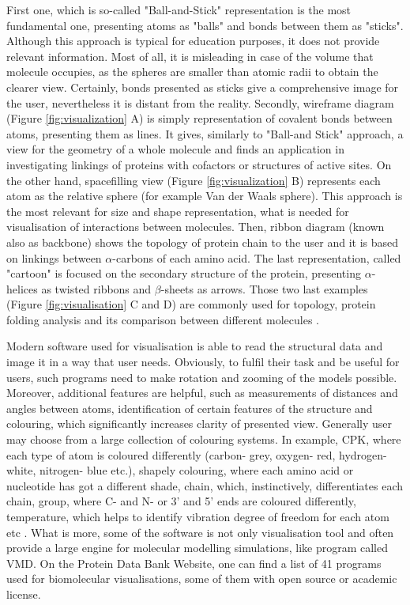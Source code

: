 First one, which is so-called "Ball-and-Stick" representation is the most fundamental one, presenting atoms as "balls" and bonds between them as "sticks". Although this approach is typical for education purposes, it does not provide relevant information. Most of all, it is misleading in case of the volume that molecule occupies, as the spheres are smaller than atomic radii to obtain the clearer view. Certainly, bonds presented as sticks give a comprehensive image for the user, nevertheless it is distant from the reality.  
Secondly, wireframe diagram (Figure \ref{fig:visualization} A) is simply representation of covalent bonds between atoms, presenting them as lines. It gives, similarly to "Ball-and Stick" approach, a view for the geometry of a whole molecule and finds an application in investigating linkings of proteins with cofactors or structures of active sites. On the other hand, spacefilling view (Figure \ref{fig:visualization} B) represents each atom as the relative sphere (for example Van der Waals sphere). This approach is the most relevant for size and shape representation, what is needed for visualisation of interactions between molecules. Then, ribbon diagram (known also as backbone) shows the topology of protein chain to the user and it is based on linkings between $\alpha$-carbons of each amino acid. The last representation, called "cartoon" is focused on the secondary structure of the protein, presenting $\alpha$-helices as twisted ribbons and $\beta$-sheets as arrows. Those two last examples (Figure \ref{fig:visualisation} C and D) are commonly used for topology, protein folding analysis and its comparison between different molecules \citep{Goodsell04, Gruca10}. 

Modern software used for visualisation is able to read the structural data and image it in a way that user needs. Obviously, to fulfil their task and be useful for users, such programs need to make rotation and zooming of the models possible. Moreover, additional features are helpful, such as measurements of distances and angles between atoms, identification of certain features of the structure and colouring, which significantly increases clarity of presented view. Generally user may choose from a large collection of colouring systems. In example, CPK, where each type of atom is coloured differently (carbon- grey, oxygen- red, hydrogen- white, nitrogen- blue etc.), shapely colouring, where each amino acid or nucleotide has got a different shade, chain, which, instinctively, differentiates each chain, group, where C- and N- or 3' and 5' ends are coloured differently, temperature, which helps to identify vibration degree of freedom for each atom etc \citep{Gruca10}. What is more, some of the software is not only visualisation tool and often provide a large engine for molecular modelling simulations, like program called VMD. On the Protein Data Bank Website, one can find a list of 41 programs used for biomolecular visualisations, some of them with open source or academic license.
 
